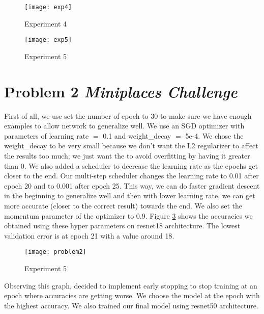 \documentclass{article}
\begin{document}
\begin{figure}[ht!]
    \centering
    \texttt{[image: exp4]}
    \caption{Experiment 4}
    \label{exp4}
\end{figure}

\begin{figure}[ht!]
    \centering
    \texttt{[image: exp5]}
    \caption{Experiment 5}
    \label{exp5}
\end{figure}


\section{Problem 2 \textit{Miniplaces Challenge}}
First of all, we use set the number of epoch to 30 to make sure we have enough examples to allow network to generalize well. We use an SGD optimizer with parameters of learning rate $=$ 0.1 and weight\_decay $=$ 5e-4. We chose the weight\_decay to be very small because we don't want the L2 regularizer to affect the results too much; we just want the to avoid overfitting by having it greater than 0. We also added a scheduler to decrease the learning rate as the epochs get closer to the end. Our multi-step scheduler changes the learning rate to 0.01 after epoch 20 and to 0.001 after epoch 25. This way, we can do faster gradient descent in the beginning to generalize well and then with lower learning rate, we can get more accurate (closer to the correct result) towards the end. We also set the momentum parameter of the optimizer to 0.9. Figure \ref{prob2} shows the accuracies we obtained using these hyper parameters on resnet18 architecture. The lowest validation error is at epoch 21 with a value around 18.

\begin{figure}[ht!]
    \centering
    \texttt{[image: problem2]}
    \caption{Experiment 5}
    \label{prob2}
\end{figure}

Observing this graph, decided to implement early stopping to stop training at an epoch where accuracies are getting worse. We choose the model at the epoch with the highest accuracy. We also trained our final model using resnet50 architecture. 
\end{document}
